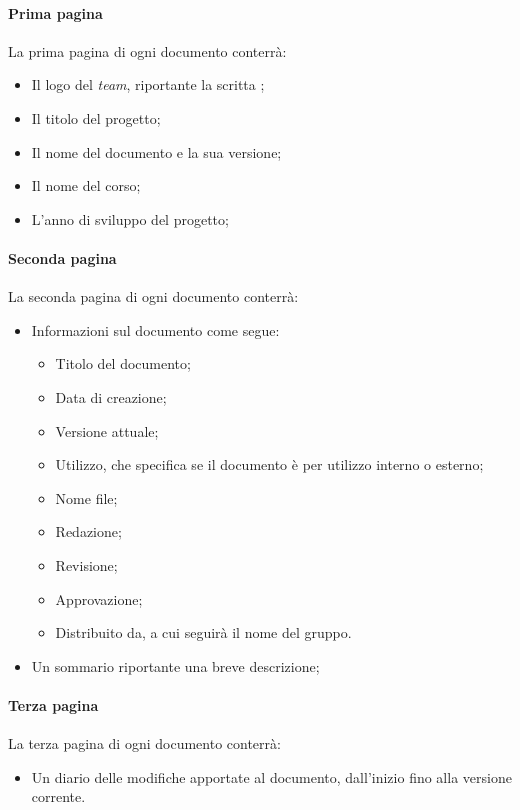 \paragraph{Prima pagina}
La prima pagina di ogni documento conterrà:
\begin{itemize}
\item Il logo del \textit{team}, riportante la scritta \gruppo;
\item Il titolo del progetto;
\item Il nome del documento e la sua versione;
\item Il nome del corso;
\item L'anno di sviluppo del progetto;
\end{itemize}

\paragraph{Seconda pagina}
La seconda pagina di ogni documento conterrà:
\begin{itemize}
\item  Informazioni sul documento come segue:
\begin{itemize}
\item Titolo del documento;
\item Data di creazione;
\item Versione attuale;
\item Utilizzo, che specifica se il documento è per utilizzo interno o esterno;
\item Nome file;
\item Redazione;
\item Revisione;
\item Approvazione;
\item Distribuito da, a cui seguirà il nome del gruppo.
\end{itemize}
\item Un sommario riportante una breve descrizione;
\end{itemize}

\paragraph{Terza pagina}
La terza pagina di ogni documento conterrà:
\begin{itemize}
\item Un diario delle modifiche apportate al documento, dall'inizio fino alla versione corrente.
\end{itemize}

